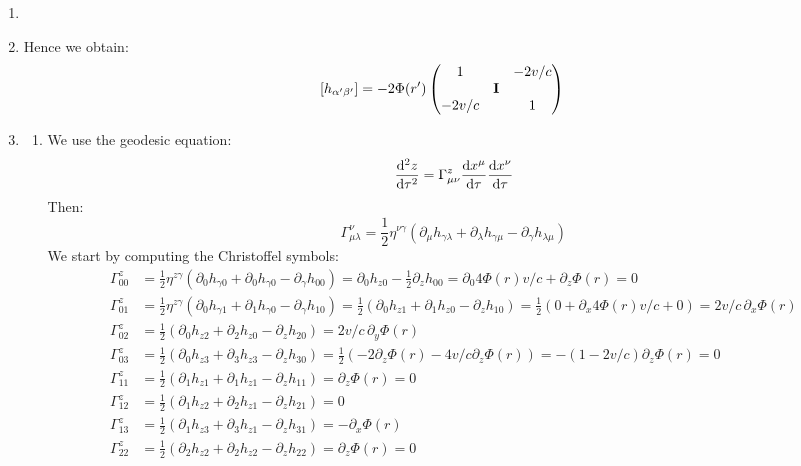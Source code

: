\documentclass[10pt,a4paper]{article}
\begin{document}
\begin{enumerate}
\item 

\item Hence we obtain:
\[
[h_{\alpha' \beta'}] = 
-2 \Phi(r')
\begin{pmatrix}
1 & & -2v/c\\
 & \vb{I} & \\
 -2v/c & & 1
\end{pmatrix}
\]

\item \begin{enumerate}

\item We use the geodesic equation:
\[
\dv[2]{z}{\tau} = \Gamma^z_{\mu \nu} \dv{x^\mu}{\tau} \dv{x^\nu}{\tau}
\]
Then:
\[
\Gamma^\nu_{\mu \lambda} = \frac{1}{2}\eta^{\nu \gamma}(\partial_\mu h_{\gamma \lambda} + \partial_{\lambda} h_{\gamma \mu} - \partial_\gamma h_{\lambda \mu})
\]
We start by computing the Christoffel symbols:
\begin{align*}
\Gamma^z_{00} &= \frac{1}{2} \eta^{z \gamma}( \partial_0 h_{\gamma 0} + \partial_0 h_{\gamma 0} - \partial_\gamma h_{00}) = \partial_0 h_{z 0} - \frac{1}{2} \partial_z h_{0 0} = \partial_0 4 \Phi(r) v /c + \partial_z \Phi(r) = 0\\
\Gamma^z_{0 1} &= \frac{1}{2} \eta^{z \gamma} (\partial_0 h_{\gamma 1} + \partial_1 h_{\gamma 0} - \partial_\gamma h_{10}) = \frac{1}{2}(\partial_0 h_{z 1} + \partial_1 h_{z 0} - \partial_z h_{10}) = \frac{1}{2}(0 + \partial_x 4 \Phi(r) v /c + 0) = 2 v /c\,  \partial_x \Phi(r)\\
\Gamma^z_{02} &= \frac{1}{2}(\partial_0 h_{z2} + \partial_2 h_{z0} - \partial_z h_{20}) = 2v/c\, \partial_y \Phi(r)\\
\Gamma^z_{0 3} &= \frac{1}{2}(\partial_0 h_{z3} + \partial_3 h_{z3} - \partial_z h_{30} ) = \frac{1}{2}(-2\partial_z \Phi(r) - 4v/c \partial_z \Phi(r) ) = -(1 - 2v/c) \partial_z \Phi(r) = 0\\
\Gamma^z_{11} &= \frac{1}{2} (\partial_1 h_{z 1} + \partial_1 h_{z 1} - \partial_z h_{11}) =  \partial_z \Phi(r) = 0 \\
\Gamma^z_{12} &= \frac{1}{2}(\partial_1 h_{z 2} + \partial_2 h_{z 1} - \partial_z h_{21}) = 0\\
\Gamma^z_{13} &= \frac{1}{2}( \partial_1 h_{z3} + \partial_3 h_{z1} - \partial_z h_{31} ) = - \partial_x \Phi(r)\\
\Gamma^{z}_{22} &= \frac{1}{2}(\partial_2 h_{z2} + \partial_2 h_{z2} - \partial_z h_{22}) = \partial_z \Phi(r) = 0\\

\end{align*}
\end{enumerate}
\end{enumerate}
\end{document}
